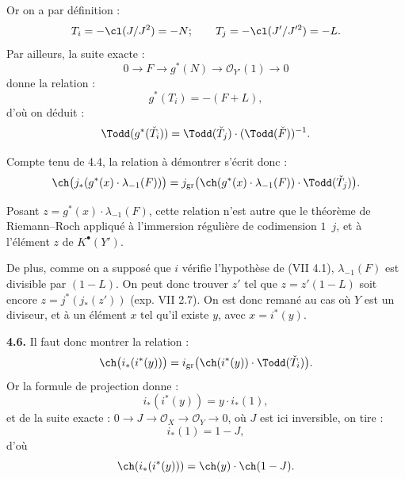 Or on a par
définition :
\[
 T_i=-\cl(J/J^2)=-N;\qquad
 T_j=-\cl(J'/J'^2)=-L.
\]
Par ailleurs, la suite exacte :
\[
0\longrightarrow F\longrightarrow g^*(N)\longrightarrow \mathcal O_{Y'}(1)\longrightarrow0
\]
donne la relation :
\[
 g^*(T_i)=-(F+L),
\]
d'où on déduit :
\[
 \Todd(g^*(\check T_i))=\Todd(\check T_j)\cdot(\Todd(\check F))^{-1}.
\]

Compte tenu de 4.4, la relation à démontrer s'écrit donc :
\[
 \ch\bigl(j_*(g^*(x)\cdot\lambda_{-1}(F))\bigr)
 =
 j_{\mathrm{gr}}\bigl(\ch(g^*(x)\cdot\lambda_{-1}(F))\cdot\Todd(\check T_j)\bigr).
\]

Posant \(z=g^*(x)\cdot\lambda_{-1}(F)\), cette relation n'est autre que le théorème de Riemann--Roch appliqué à l'immersion régulière de codimension \(1\)~\(j\), et à l'élément \(z\) de \(K^{\bullet}(Y')\).

De plus, comme on a supposé que \(i\) vérifie l'hypothèse de (VII 4.1), \(\lambda_{-1}(F)\) est divisible par \((1-L)\). On peut donc trouver \(z'\) tel que \(z=z'(1-L)\) soit encore \(z=j^*(j_*(z'))\) (exp. VII 2.7). On est donc remané au cas où \(Y\) est un diviseur, et à un élément \(x\) tel qu'il existe \(y\), avec \(x=i^*(y)\).

\textbf{4.6.} Il faut donc montrer la relation :
\[
 \ch\bigl(i_*(i^*(y))\bigr)
 =
 i_{\mathrm{gr}}\bigl(\ch(i^*(y))\cdot\Todd(\check T_i)\bigr).
\]
Or la formule de projection donne :
\[
 i_*(i^*(y))=y\cdot i_*(1),
\]
et de la suite exacte : \(0\longrightarrow J\longrightarrow\mathcal O_X\longrightarrow\mathcal O_Y\longrightarrow0\), où \(J\) est ici inversible, on tire :
\[
 i_*(1)=1-J,
\]
d'où
\[
 \ch(i_*(i^*(y)))=\ch(y)\cdot\ch(1-J).
\]
